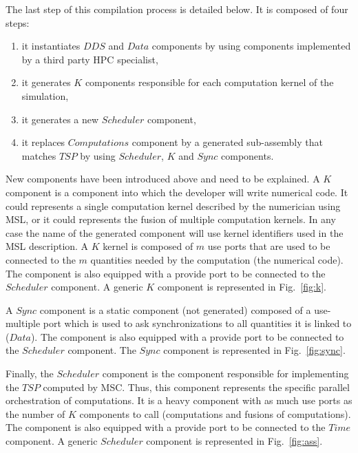 The last step of this compilation process is detailed below. It is composed of four steps:
\begin{enumerate}
 \item it instantiates $DDS$ and $Data$ components by using components implemented by a third party HPC specialist,
 \item it generates $K$ components responsible for each computation kernel of the simulation,
 \item it generates a new $Scheduler$ component,
 \item it replaces $Computations$ component by a generated sub-assembly that matches $TSP$ by using $Scheduler$, $K$ and $Sync$ components.
 \end{enumerate}

New components have been introduced above and need to be explained. A $K$ component is a component into which the developer will write numerical code. It could represents a single computation kernel described by the numerician using MSL, or it could represents the fusion of multiple computation kernels. In any case the name of the generated component will use kernel identifiers used in the MSL description. A $K$ kernel is composed of $m$ use ports that are used to be connected to the $m$ quantities needed by the computation (\ie the numerical code). The component is also equipped with a provide port to be connected to the $Scheduler$ component. A generic $K$ component is represented in Fig.~\ref{fig:k}.

A $Sync$ component is a static component (not generated) composed of a use-multiple port which is used to ask synchronizations to all quantities it is linked to ($Data$). The component is also equipped with a provide port to be connected to the $Scheduler$ component. The $Sync$ component is represented in Fig.~\ref{fig:sync}.

Finally, the $Scheduler$ component is the component responsible for implementing the $TSP$ computed by MSC. Thus, this component represents the specific parallel orchestration of  computations. It is a heavy component with as much use ports as the number of $K$ components to call (\ie computations and fusions of computations). The component is also equipped with a provide port to be connected to the $Time$ component. A generic $Scheduler$ component is represented in Fig.~\ref{fig:ass}.


